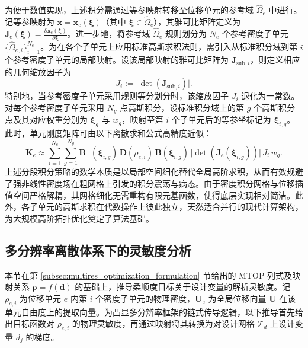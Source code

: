 为便于数值实现，上述积分需通过等参映射转移至位移单元的参考域 $\hat{\Omega}_e$ 中进行。记等参映射为 $\boldsymbol{x}=\boldsymbol{x}_e(\boldsymbol\xi)$（其中 $\boldsymbol\xi\in\hat{\Omega}_e$），其雅可比矩阵定义为 $\boldsymbol{J}_e(\boldsymbol\xi)=\frac{\partial\boldsymbol{x}_e(\boldsymbol\xi)}{\partial\boldsymbol\xi}$。进一步地，将参考域 $\hat{\Omega}_e$ 规则划分为 $N_e$ 个参考密度子单元 $\{\hat{\Omega}_{e,i}\}_{i=1}^{N_e}$。为在各个子单元上应用标准高斯求积法则，需引入从标准积分域到第 $i$ 个参考密度子单元的局部映射。设该局部映射的雅可比矩阵为 $\boldsymbol{J}_{\text{sub},i}$，则定义相应的几何缩放因子为
\[
J_i:=\big|\det(\boldsymbol{J}_{\text{sub},i})\big|.
\]
特别地，当参考密度子单元采用规则等分划分时，该缩放因子 $J_i$ 退化为一常数。 对每个参考密度子单元采用 $N_g$ 点高斯积分，设标准积分域上的第 $g$ 个高斯积分点及其对应权重分别为 $\boldsymbol\xi_{g}$ 与 $w_g$，映射至第 $i$ 个子单元后的等参坐标记为 $\boldsymbol\xi_{i,g}$。此时，单元刚度矩阵可由以下离散求和公式高精度近似：
\begin{equation} \label{eq:ch4_subcell_stiffness}
	\boldsymbol{K}_e \approx \sum_{i=1}^{N_e}\sum_{g=1}^{N_g} \boldsymbol{B}^{\top}(\boldsymbol\xi_{i,g})\,\boldsymbol{D}(\rho_{e,i})\,\boldsymbol{B}(\boldsymbol\xi_{i,g})\, \big|\det(\boldsymbol{J}_e(\boldsymbol\xi_{i,g}))\big|\, J_i\, w_g.
\end{equation}
上述分段积分策略的数学本质是以局部空间细化替代全局高阶求积，从而有效规避了强非线性密度场在粗网格上引发的积分震荡与病态。由于密度积分网格与位移插值空间严格解耦，其网格细化无需重构有限元基函数，使得底层实现相对简洁。此外，各子单元的高斯求积在代数操作上彼此独立，天然适合并行的现代计算架构，为大规模高阶拓扑优化奠定了算法基础。


\subsection{多分辨率离散体系下的灵敏度分析}
\label{subsec:sensitivity_analysis}

本节在第 \ref{subsec:multires_optimization_formulation} 节给出的 MTOP 列式及映射关系 $\boldsymbol\rho=f(\boldsymbol{d})$ 的基础上，推导柔顺度目标关于设计变量的解析灵敏度。记 $\rho_{e,i}$ 为位移单元 $e$ 内第 $i$ 个密度子单元的物理密度，$\boldsymbol U_e$ 为全局位移向量 $\boldsymbol U$ 在该单元自由度上的提取向量。为凸显多分辨率框架的链式传导逻辑，以下推导首先给出目标函数对 $\rho_{e,i}$ 的物理灵敏度，再通过映射将其转换为对设计网格 $\mathcal{T}_d$ 上设计变量 $d_{j}$ 的梯度。

